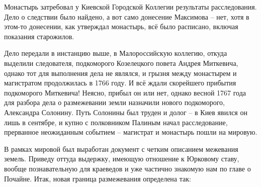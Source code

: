 Монастырь затребовал у Киевской Городской Коллегии результаты расследования. Дело о следствии было найдено, а вот само донесение Максимова – нет, хотя в этом-то донесении, как утверждал монастырь, всё было расписано, включая показания старожилов. 

Дело передали в инстанцию выше, в Малороссийскую коллегию, откуда выделили следователя, подкоморого Козелецкого повета Андрея Миткевича, однако тот для выполнения дела не являлся, и грызня между монастырем и магистратом продолжилась в 1766 году. И всё ждали скорейшего прибытия подкоморого Миткевича! Неясно, прибыл он или нет, однако весной 1767 года для разбора дела о размежевании земли назначили нового подкоморого, Александра Солонину. Путь Солонины был труден и долог – в Киев явился он лишь в сентябре, и купно с полковником Палиным начал расследование, прерванное неожиданным событием – магистрат и монастырь пошли на мировую. 

В рамках мировой был выработан документ с четким описанием межевания земель. Приведу оттуда выдержку, имеющую отношение к Юрковому ставу,  вообще познавательную для краеведов и уже частично знакомую нам по главе о Почайне. Итак, новая граница размежевания определена так:

